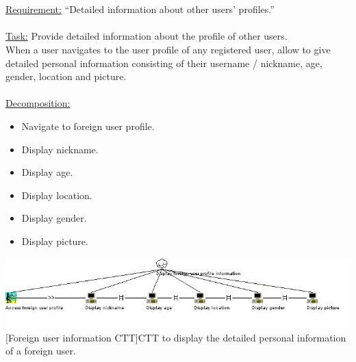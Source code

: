 \documentclass[11pt, a4paper,svglistings,oneside]{book}
\begin{document}
$\;$ \\ \\
\underline{Requirement:} ``Detailed information about other users' profiles.'' \\ \\
\underline{Task:} Provide detailed information about the profile of other users. \\
When a user navigates to the user profile of any registered user, allow to give detailed personal information consisting of their username / nickname, age, gender, location and picture. \\ \\
\underline{Decomposition:}
\begin{itemize}
\item Navigate to foreign user profile.
\item Display nickname.
\item Display age.
\item Display location.
\item Display gender.
\item Display picture.
\end{itemize}
\noindent\begin{minipage}{\textwidth}
    \centering
   \includegraphics[width=\textwidth]{CTT_Foreign.png}
 [Foreign user information CTT]{CTT to display the detailed personal information of a foreign user.}
\end{minipage}
\end{document}
